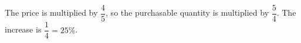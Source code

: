 The price is multiplied by $\dfrac{4}{5}$, so the purchasable quantity is multiplied by $\dfrac{5}{4}$. The increase is $\dfrac{1}{4}=\boxed{25\%}$.
